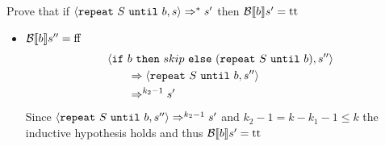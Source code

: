\begin{exercise}{
    Prove that if $\left<\texttt{repeat}\ S\ \texttt{until}\ b, s\right> \Rightarrow^* s'$ then $\mathcal{B} \llbracket b \rrbracket s' = \text{tt}$ \vspace*{0.4cm}
}
\begin{itemize}
\begin{itemize}
                \item $\mathcal{B} \llbracket b \rrbracket s'' = \text{ff}$
                    \begin{align*}
                        &\left<\texttt{if}\ b\ \texttt{then}\ skip\ \texttt{else}\ (\texttt{repeat}\ S\ \texttt{until}\ b), s''\right>
                        \\&\qquad \Rightarrow \left<\texttt{repeat}\ S\ \texttt{until}\ b, s''\right>
                        \\&\qquad \Rightarrow^{k_2 - 1} s'
                    \end{align*}
                    Since $\left<\texttt{repeat}\ S\ \texttt{until}\ b, s''\right> \Rightarrow^{k_2 - 1} s'$ and $k_2 - 1 = k - k_1 - 1 \leq k$ the inductive hypothesis holds and thus $\mathcal{B} \llbracket b \rrbracket s' = \text{tt}$
            \end{itemize}
    \end{itemize}
\end{exercise}
